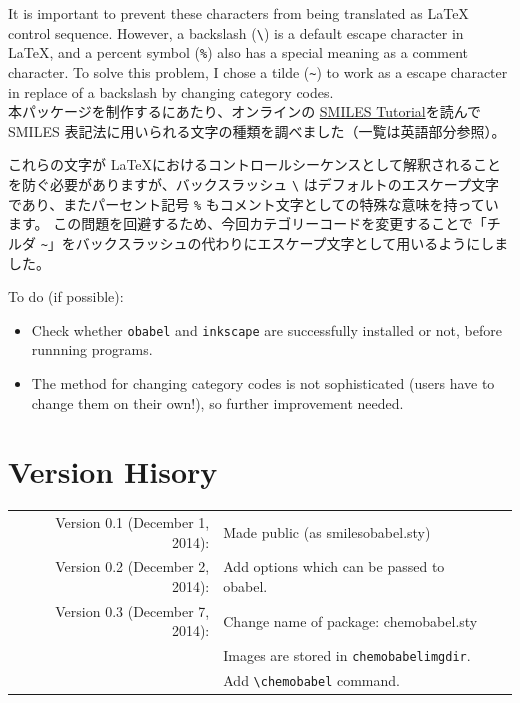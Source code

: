 \documentclass[12pt]{jsarticle}
\begin{document}
It is important to prevent these characters from being translated as {\LaTeX} control sequence.
However, a backslash (\verb|\|) is a default escape character in {\LaTeX}, and a percent symbol (\verb|%|) also has a special meaning as a comment character.
To solve this problem, I chose a tilde (\verb|~|) to work as a escape character in replace of a backslash by changing category codes. \\

本パッケージを制作するにあたり、オンラインの \href{http://www.daylight.com/meetings/summerschool98/course/dave/smiles-intro.html}{SMILES Tutorial}を読んで SMILES 表記法に用いられる文字の種類を調べました（一覧は英語部分参照）。

これらの文字が \LaTeX におけるコントロールシーケンスとして解釈されることを防ぐ必要がありますが、バックスラッシュ \verb|\| はデフォルトのエスケープ文字であり、またパーセント記号 \verb|%| もコメント文字としての特殊な意味を持っています。
この問題を回避するため、今回カテゴリーコードを変更することで「チルダ \verb|~|」をバックスラッシュの代わりにエスケープ文字として用いるようにしました。

\clearpage

To do (if possible):
\begin{itemize}
\item Check whether \texttt{obabel} and \texttt{inkscape} are successfully installed or not, before runnning programs.
\item The method for changing category codes is not sophisticated (users have to change them on their own!), so further improvement needed.
\end{itemize}

\section{Version Hisory}

\begin{table}[h]
\centering
\begin{tabular}{rll}
Version 0.1 (December 1, 2014): & Made public (as \textsf{smilesobabel.sty}) \\
Version 0.2 (December 2, 2014): & Add options which can be passed to obabel. \\
Version 0.3 (December 7, 2014): & Change name of package: \textsf{chemobabel.sty} \\
 & Images are stored in \texttt{chemobabelimgdir}. \\
 & Add \verb|\chemobabel| command.
\end{tabular}
\end{table}
\end{document}
